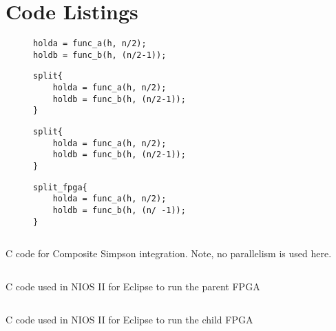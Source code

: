 \chapter{Code Listings}

\begin{figure}[!h]
    \begin{minipage}{0.45\textwidth}
    \centering
    \begin{verbatim}
holda = func_a(h, n/2);
holdb = func_b(h, (n/2-1));
    \end{verbatim}
    \end{minipage}
    \begin{minipage}{0.45\textwidth}
    \centering
    \begin{verbatim}
split{
    holda = func_a(h, n/2);
    holdb = func_b(h, (n/2-1));
}
    \end{verbatim}
    \end{minipage}
     \label{lst:org_to_par}
\end{figure}

\begin{figure}[!h]
    \begin{minipage}{0.45\textwidth}
    \centering
    \begin{verbatim}
split{
    holda = func_a(h, n/2);
    holdb = func_b(h, (n/2-1));
}
    \end{verbatim}
    \end{minipage}
    \begin{minipage}{0.45\textwidth}
    \centering
    \begin{verbatim}
split_fpga{
    holda = func_a(h, n/2);
    holdb = func_b(h, (n/ -1));
}
    \end{verbatim}
    \end{minipage}
     \label{lst:par_to_off}
\end{figure}

\begin{listing}
    \inputminted[]{c}{08_code_listings/code/integration_seq.c}
    \caption{C code for Composite Simpson integration. Note, no parallelism is used here. }
    \label{lst:c_simp_st}
\end{listing}


\begin{listing}
    \inputminted[]{c}{08_code_listings/code/host_fpga.c}
    \caption{C code used in NIOS II for Eclipse to run the parent FPGA }
    \label{lst:parent_code}
\end{listing}

\begin{listing}
    \inputminted[]{c}{08_code_listings/code/child_fpga.c}
    \caption{C code used in NIOS II for Eclipse to run the child FPGA }
    \label{lst:child_code}
\end{listing}
